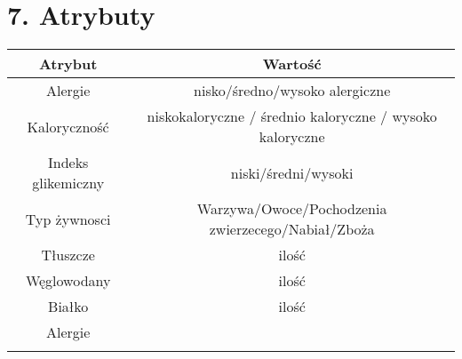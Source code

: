 \documentclass{article}
\begin{document}

\section*{7. Atrybuty}

\begin{table}[H]
\begin{tabular}{|c|c|}
\hline
Atrybut            & Wartość                                                  \\ \hline
Alergie            & nisko/średno/wysoko alergiczne                           \\ \hline
Kaloryczność       & niskokaloryczne / średnio kaloryczne / wysoko kaloryczne \\ \hline
Indeks glikemiczny & niski/średni/wysoki                                      \\ \hline
Typ żywnosci       & Warzywa/Owoce/Pochodzenia zwierzecego/Nabiał/Zboża       \\ \hline
Tłuszcze           & ilość                                                    \\ \hline
Węglowodany        & ilość                                                    \\ \hline
Białko             & ilość                                                    \\ \hline
Alergie            &                                                          \\ \hline
                   &                                                          \\ \hline
\end{tabular}
\end{table}
\end{document}
